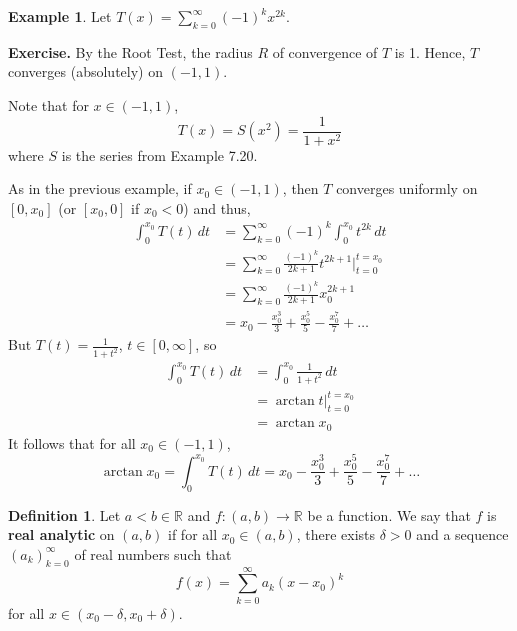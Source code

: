\documentclass[11pt]{article}
\theoremstyle{definition}
\newtheorem{defn}[thm]{Definition}
\newtheorem{exmp}[thm]{Example}
\newcommand{\mbR}{\ensuremath{\mathbb{R}}}
\begin{document}
\begin{exmp}
Let $T(x) = \sum_{k=0}^\infty (-1)^k x^{2k}$. 

\textbf{Exercise.} By the Root Test, the radius $R$ of convergence of $T$ is 1. Hence, $T$ converges (absolutely) on $(-1, 1)$.

Note that for $x \in (-1, 1)$,
$$T(x) = S(x^2) = \frac{1}{1+x^2}$$
where $S$ is the series from Example 7.20.

As in the previous example, if $x_0 \in (-1, 1)$, then $T$ converges uniformly on $[0, x_0]$ (or $[x_0, 0]$ if $x_0 < 0$) and thus,
\begin{align*}
\int_0^{x_0} T(t)\,dt 
& = \sum_{k=0}^\infty (-1)^k \int_0^{x_0} t^{2k}\,dt \\
& = \sum_{k=0}^\infty \frac{(-1)^k}{2k+1} t^{2k+1} \biggr|_{t=0}^{t=x_0} \\
& = \sum_{k=0}^\infty \frac{(-1)^k}{2k+1} x_0^{2k+1} \\
& = x_0 - \frac{x_0^3}3 + \frac{x_0^5}5 - \frac{x_0^7}7 + \dots
\end{align*}
But $T(t) = \frac{1}{1+t^2}$, $t \in [0, \infty]$, so
\begin{align*}
\int_0^{x_0} T(t)\,dt 
& = \int_0^{x_0} \frac{1}{1+t^2}\,dt \\
& = \arctan t \biggr|_{t=0}^{t=x_0} \\
& = \arctan x_0
\end{align*}
It follows that for all $x_0 \in (-1, 1)$,
$$\arctan x_0 = \int_0^{x_0} T(t)\,dt = x_0 - \frac{x_0^3}3 + \frac{x_0^5}5 - \frac{x_0^7}7 + \dots$$
\end{exmp}

\begin{defn}
Let $a < b \in \mbR$ and $f : (a, b) \to \mbR$ be a function. We say that $f$ is \textbf{real analytic} on $(a, b)$ if for all $x_0 \in (a, b)$, there exists $\delta > 0$ and a sequence $(a_k)_{k=0}^\infty$ of real numbers such that
$$f(x) = \sum_{k=0}^\infty a_k (x - x_0)^k$$
for all $x \in (x_0 - \delta, x_0 + \delta)$.
\end{defn}
\end{document}
